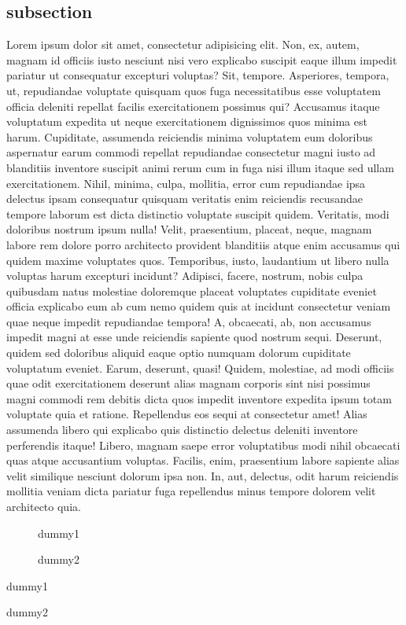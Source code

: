 \documentclass{article}
\begin{document}
\subsection{subsection}
Lorem ipsum dolor sit amet, consectetur adipisicing elit. Non, ex, autem, magnam id officiis iusto nesciunt nisi vero explicabo suscipit eaque illum impedit pariatur ut consequatur excepturi voluptas? Sit, tempore.
Asperiores, tempora, ut, repudiandae voluptate quisquam quos fuga necessitatibus esse voluptatem officia deleniti repellat facilis exercitationem possimus qui? Accusamus itaque voluptatum expedita ut neque exercitationem dignissimos quos minima est harum.
Cupiditate, assumenda reiciendis minima voluptatem eum doloribus aspernatur earum commodi repellat repudiandae consectetur magni iusto ad blanditiis inventore suscipit animi rerum cum in fuga nisi illum itaque sed ullam exercitationem.
Nihil, minima, culpa, mollitia, error cum repudiandae ipsa delectus ipsam consequatur quisquam veritatis enim reiciendis recusandae tempore laborum est dicta distinctio voluptate suscipit quidem. Veritatis, modi doloribus nostrum ipsum nulla!
Velit, praesentium, placeat, neque, magnam labore rem dolore porro architecto provident blanditiis atque enim accusamus qui quidem maxime voluptates quos. Temporibus, iusto, laudantium ut libero nulla voluptas harum excepturi incidunt?
Adipisci, facere, nostrum, nobis culpa quibusdam natus molestiae doloremque placeat voluptates cupiditate eveniet officia explicabo eum ab cum nemo quidem quis at incidunt consectetur veniam quae neque impedit repudiandae tempora!
A, obcaecati, ab, non accusamus impedit magni at esse unde reiciendis sapiente quod nostrum sequi. Deserunt, quidem sed doloribus aliquid eaque optio numquam dolorum cupiditate voluptatum eveniet. Earum, deserunt, quasi!
Quidem, molestiae, ad modi officiis quae odit exercitationem deserunt alias magnam corporis sint nisi possimus magni commodi rem debitis dicta quos impedit inventore expedita ipsum totam voluptate quia et ratione.
Repellendus eos sequi at consectetur amet! Alias assumenda libero qui explicabo quis distinctio delectus deleniti inventore perferendis itaque! Libero, magnam saepe error voluptatibus modi nihil obcaecati quas atque accusantium voluptas.
Facilis, enim, praesentium labore sapiente alias velit similique nesciunt dolorum ipsa non. In, aut, delectus, odit harum reiciendis mollitia veniam dicta pariatur fuga repellendus minus tempore dolorem velit architecto quia.


\begin{figure} \caption{dummy1} \end{figure}
\begin{figure} \caption{dummy2} \end{figure}

\begin{table} \caption{dummy1} \end{table}
\begin{table} \caption{dummy2} \end{table}


\begin{appendix}
\listoftables
\listoftables
\end{appendix}
\end{document}
